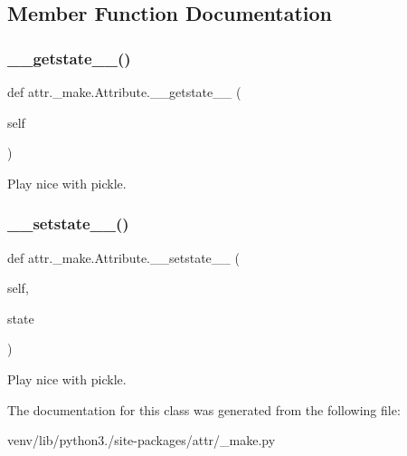 \subsection{Member Function Documentation}
\mbox{\label{classattr_1_1__make_1_1_attribute_a615f79f2a794da987c3a60bd8e87ca20}} 
\subsubsection{\texorpdfstring{\+\_\+\+\_\+getstate\+\_\+\+\_\+()}{\_\_getstate\_\_()}}
{\footnotesize\ttfamily def attr.\+\_\+make.\+Attribute.\+\_\+\+\_\+getstate\+\_\+\+\_\+ (\begin{DoxyParamCaption}\item[{}]{self }\end{DoxyParamCaption})}

\begin{DoxyVerb}Play nice with pickle.
\end{DoxyVerb}
 \mbox{\label{classattr_1_1__make_1_1_attribute_a699d6f5fd489310cd1cfe320a79bb32d}} 
\subsubsection{\texorpdfstring{\+\_\+\+\_\+setstate\+\_\+\+\_\+()}{\_\_setstate\_\_()}}
{\footnotesize\ttfamily def attr.\+\_\+make.\+Attribute.\+\_\+\+\_\+setstate\+\_\+\+\_\+ (\begin{DoxyParamCaption}\item[{}]{self,  }\item[{}]{state }\end{DoxyParamCaption})}

\begin{DoxyVerb}Play nice with pickle.
\end{DoxyVerb}
 

The documentation for this class was generated from the following file\+:\begin{DoxyCompactItemize}
\item 
venv/lib/python3./site-\/packages/attr/\+\_\+make.\+py\end{DoxyCompactItemize}
